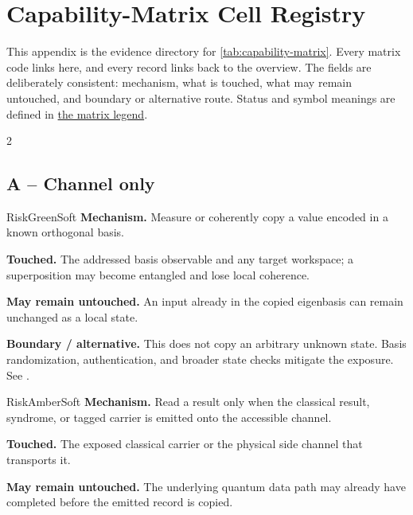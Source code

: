 \section{Capability-Matrix Cell Registry}
\label{app:capability-registry}

This appendix is the evidence directory for \cref{tab:capability-matrix}. Every
matrix code links here, and every record links back to the overview. The fields
are deliberately consistent: mechanism, what is touched, what may remain
untouched, and boundary or alternative route. Status and symbol meanings are
defined in \hyperlink{matrix:legend}{the matrix legend}.

\begin{multicols}{2}
\subsection*{A -- Channel only}
\hypertarget{cell:A1}{}
\begin{matrixrecord}{RiskGreenSoft}
\textbf{Mechanism.} Measure or coherently copy a value encoded in a known orthogonal basis.

\textbf{Touched.} The addressed basis observable and any target workspace; a superposition may become entangled and lose local coherence.

\textbf{May remain untouched.} An input already in the copied eigenbasis can remain unchanged as a local state.

\textbf{Boundary / alternative.} This does not copy an arbitrary unknown state. Basis randomization, authentication, and broader state checks mitigate the exposure. See \cite{nielsen2010quantum,barnum1996broadcasting}.

\hfill\matrixback
\end{matrixrecord}

\hypertarget{cell:A2}{}
\begin{matrixrecord}{RiskAmberSoft}
\textbf{Mechanism.} Read a result only when the classical result, syndrome, or tagged carrier is emitted onto the accessible channel.

\textbf{Touched.} The exposed classical carrier or the physical side channel that transports it.

\textbf{May remain untouched.} The underlying quantum data path may already have completed before the emitted record is copied.


\end{matrixrecord}
\end{multicols}
